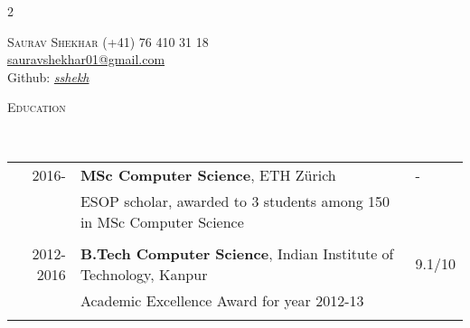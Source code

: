 \documentclass[9pt]{article}
\renewcommand{\arraystretch}{1.5}
\newenvironment{changemargin}[2]{%
  \begin{list}{}{%
    \setlength{\topsep}{0pt}%
    \setlength{\leftmargin}{#1}%
    \setlength{\rightmargin}{#2}%
    \setlength{\listparindent}{\parindent}%
    \setlength{\itemindent}{\parindent}%
    \setlength{\parsep}{\parskip}%
  }%
  \item[]}{\end{list}
}
\newcommand{\lineover}{
	\begin{changemargin}{-0.05in}{-0.10in}
		\vspace*{-9pt}
		\hrulefill \\
		\vspace*{-2pt}
	\end{changemargin}
}
\newcommand{\header}[1]{
	\begin{changemargin}{-0.5in}{-0.5in}
		\scshape{#1}\\
  	\lineover
	\end{changemargin}
}
\newcommand{\name}[1]{
	  	{\LARGE \scshape {#1}}
}
\newcommand{\contact}[4]{
	\begin{changemargin}{-0.65in}{-0.65in}
		\begin{multicols}{2}
			\name{{#1}}\vfill\null %
			\columnbreak
			{#2}\\	
			{#3}\\ 
			{#4}\\ 
		\end{multicols}
	\end{changemargin}
}
\begin{document}
\contact{Saurav Shekhar}
{{\hspace{172pt}}(+41) 76 410 31 18}
{{\hspace{130pt}} \href{mailto:sauravshekhar01@gmail.com}{sauravshekhar01@gmail.com}}
{\hspace{190pt}Github: \href{http://github.com/sshekh}{\emph{{\textit{sshekh}}}}}
 
\header{Education}

\vspace{4pt}
	\renewcommand{\arraystretch}{1}
	\begin{tabular}{rll}
	2016- & \textbf{MSc Computer Science},  ETH Z{\"u}rich  &- \\
		  & ESOP scholar, awarded to 3 students among 150 in MSc Computer Science &\\\\
2012-2016 & \textbf{B.Tech Computer Science},  Indian Institute of Technology, Kanpur & 9.1/10 \\ 
		  &  Academic Excellence Award for year 2012-13 & \\\\
	\end{tabular}

\end{document}
